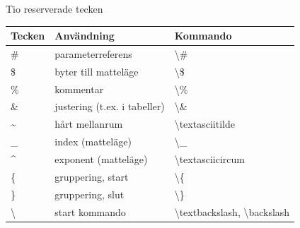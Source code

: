 \documentclass[xcolor=x11names,compress,swedish]{beamer}
\newcommand*{\Lcode}{\lstinline[{language=[LaTeX]TeX}]}
\begin{document}
		\begin{frame}{Tio reserverade tecken}
			\begin{tabular}{lll}
				Tecken & Användning & Kommando\\ \toprule
				\#	& parameterreferens	& \textbackslash\#\\
				\$	& byter till matteläge	& \textbackslash\$\\
				\%	& kommentar	& \textbackslash\%\\
				\&	& justering (t.ex. i tabeller)	& \textbackslash\&\\
				\textasciitilde & hårt mellanrum	& \textbackslash textasciitilde\\
				\_	& index (matteläge)	& \textbackslash\_\\
				\textasciicircum & exponent (matteläge)	& \textbackslash textasciicircum\\
				\{	& gruppering, start	& \textbackslash\{\\
				\}	& gruppering, slut	& \textbackslash\}\\
				\textbackslash & start kommando	& \textbackslash textbackslash, \textbackslash backslash
			\end{tabular}
		\end{frame}
	
		
\end{document}
